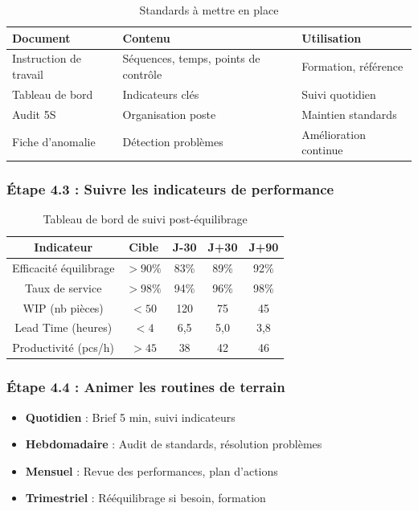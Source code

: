 \documentclass[12pt,a4paper]{article}
\newenvironment{methodbox}[1]
  {\begin{tcolorbox}[colback=blue!5!white, colframe=methodcolor, title=#1]\small}
  {\end{tcolorbox}}
\begin{document}
\begin{table}[H]
\centering
\begin{tabular}{|p{4cm}|p{4cm}|p{4cm}|}
\hline
\textbf{Document} & \textbf{Contenu} & \textbf{Utilisation} \\
\hline
Instruction de travail & Séquences, temps, points de contrôle & Formation, référence \\
\hline
Tableau de bord & Indicateurs clés & Suivi quotidien \\
\hline
Audit 5S & Organisation poste & Maintien standards \\
\hline
Fiche d'anomalie & Détection problèmes & Amélioration continue \\
\hline
\end{tabular}
\caption{Standards à mettre en place}
\end{table}

\subsubsection{Étape 4.3 : Suivre les indicateurs de performance}

\begin{table}[H]
\centering
\begin{tabular}{|c|c|c|c|c|}
\hline
\textbf{Indicateur} & \textbf{Cible} & \textbf{J-30} & \textbf{J+30} & \textbf{J+90} \\
\hline
Efficacité équilibrage & $> 90\%$ & 83\% & 89\% & 92\% \\
\hline
Taux de service & $> 98\%$ & 94\% & 96\% & 98\% \\
\hline
WIP (nb pièces) & $< 50$ & 120 & 75 & 45 \\
\hline
Lead Time (heures) & $< 4$ & 6,5 & 5,0 & 3,8 \\
\hline
Productivité (pcs/h) & $> 45$ & 38 & 42 & 46 \\
\hline
\end{tabular}
\caption{Tableau de bord de suivi post-équilibrage}
\end{table}

\subsubsection{Étape 4.4 : Animer les routines de terrain}

\begin{methodbox}{Routines d'amélioration continue}
\begin{itemize}
    \item \textbf{Quotidien} : Brief 5 min, suivi indicateurs
    \item \textbf{Hebdomadaire} : Audit de standards, résolution problèmes
    \item \textbf{Mensuel} : Revue des performances, plan d'actions
    \item \textbf{Trimestriel} : Rééquilibrage si besoin, formation
\end{itemize}
\end{methodbox}
\end{document}
